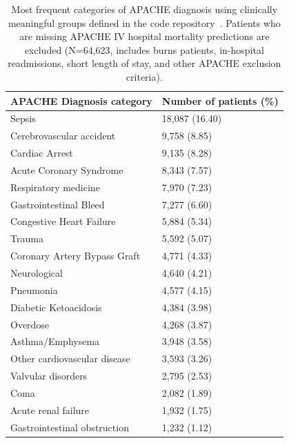 \documentclass[english]{article}
\begin{document}
\begin{center}
\begin{table}
\begin{tabular}{l|p{4cm}}
APACHE Diagnosis category & Number of patients (\%) \\ \hline
Sepsis                                   & 18,087 (16.40) \\
Cerebrovascular accident                 &  9,758 (8.85) \\
Cardiac Arrest                           &  9,135 (8.28) \\
Acute Coronary Syndrome                  &  8,343 (7.57) \\
Respiratory medicine                     &  7,970 (7.23) \\
Gastrointestinal Bleed                   &  7,277 (6.60) \\
Congestive Heart Failure                 &  5,884 (5.34) \\
Trauma                                   &  5,592 (5.07) \\
Coronary Artery Bypass Graft             &  4,771 (4.33) \\
Neurological                             &  4,640 (4.21) \\
Pneumonia                                &  4,577 (4.15) \\
Diabetic Ketoacidosis                    &  4,384 (3.98) \\
Overdose                                 &  4,268 (3.87) \\
Asthma/Emphysema                         &  3,948 (3.58) \\
Other cardiovascular disease             &  3,593 (3.26) \\
Valvular disorders                       &  2,795 (2.53) \\
Coma                                     &  2,082 (1.89) \\
Acute renal failure                      &  1,932 (1.75) \\
Gastrointestinal obstruction             &  1,232 (1.12) \\
\hline
\end{tabular}
\caption{Most frequent categories of APACHE diagnosis using clinically
meaningful groups defined in the code repository~\cite{eicu-code}.
Patients who are missing APACHE IV hospital mortality
predictions are excluded (N=64,623, includes burns patients, in-hospital
readmissions, short length of stay, and other APACHE exclusion criteria).
\label{tab:apachedx_groups}}
\end{table}
\end{center}
\end{document}
